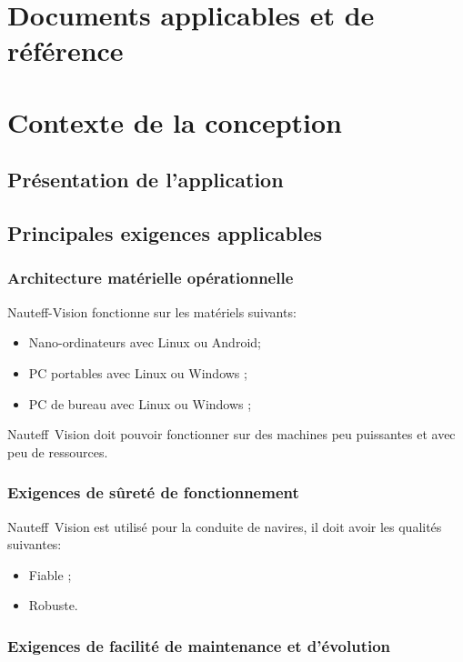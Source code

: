 \documentclass[a4paper,11pt]{report}
\begin{document}
\chapter{Documents applicables et de référence}

\printglossary[numberedsection, type=\acronymtype, title=Terminologie]

\chapter{Contexte de la conception}
\section{Présentation de l'application}
\section{Principales exigences applicables}
\subsection{Architecture matérielle opérationnelle}
Nauteff-Vision fonctionne sur les matériels suivants:
\begin{itemize}
	\item Nano-ordinateurs avec Linux ou Android;
	\item PC portables avec Linux ou Windows ;
	\item PC de bureau avec Linux ou Windows ;
\end{itemize}
Nauteff~Vision doit pouvoir fonctionner sur des machines
peu puissantes et avec peu de ressources. 

\subsection{Exigences de sûreté de fonctionnement}

Nauteff~Vision est utilisé pour la conduite de navires,
il doit avoir les qualités suivantes:
\begin{itemize}
	\item Fiable ;
	\item Robuste.
\end{itemize}

\subsection{Exigences de facilité de maintenance et d'évolution}
\end{document}

